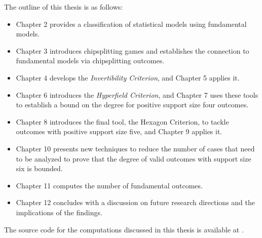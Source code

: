 The outline of this thesis is as follows: 
\begin{itemize}
    \item Chapter 2 provides a classification of statistical models using fundamental models.
    \item Chapter 3 introduces chipsplitting games and establishes the connection to fundamental models via chipsplitting outcomes.
    \item Chapter 4 develops the \emph{Invertibility Criterion}, and Chapter 5 applies it.
    \item Chapter 6 introduces the \emph{Hyperfield Criterion}, and Chapter 7 uses these tools to establish a bound on the degree for positive support size four outcomes.
    \item Chapter 8 introduces the final tool, the Hexagon Criterion, to tackle outcomes with positive support size five, and Chapter 9 applies it.
    \item Chapter 10 presents new techniques to reduce the number of cases that need to be analyzed to prove that the degree of valid outcomes with support size six is bounded.
    \item Chapter 11 computes the number of fundamental outcomes.
    \item Chapter 12 concludes with a discussion on future research directions and the implications of the findings.
\end{itemize}


The source code for the computations discussed in this thesis is available at \cite{ducrepo}.
